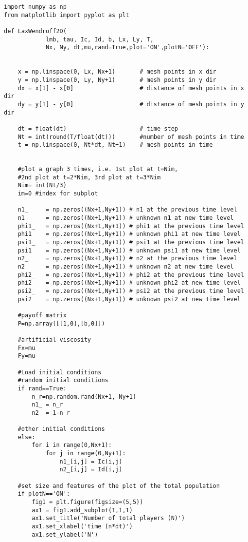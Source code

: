 \begin{lstlisting}
import numpy as np
from matplotlib import pyplot as plt

def LaxWendroff2D(
			lmb, tau, Ic, Id, b, Lx, Ly, T,
			Nx, Ny, dt,mu,rand=True,plot='ON',plotN='OFF'):
   
    
    x = np.linspace(0, Lx, Nx+1)       # mesh points in x dir
    y = np.linspace(0, Ly, Ny+1)       # mesh points in y dir
    dx = x[1] - x[0]                   # distance of mesh points in x dir 
    dy = y[1] - y[0]                   # distance of mesh points in y dir 

    dt = float(dt)                     # time step
    Nt = int(round(T/float(dt)))       #number of mesh points in time
    t = np.linspace(0, Nt*dt, Nt+1)    # mesh points in time

    
    #plot a graph 3 times, i.e. 1st plot at t=Nim, 
    #2nd plot at t=2*Nim, 3rd plot at t=3*Nim
    Nim= int(Nt/3)
    im=0 #index for subplot
       
    n1_     = np.zeros((Nx+1,Ny+1)) # n1 at the previous time level
    n1      = np.zeros((Nx+1,Ny+1)) # unknown n1 at new time level
    phi1_   = np.zeros((Nx+1,Ny+1)) # phi1 at the previous time level
    phi1    = np.zeros((Nx+1,Ny+1)) # unknown phi1 at new time level
    psi1_   = np.zeros((Nx+1,Ny+1)) # psi1 at the previous time level
    psi1    = np.zeros((Nx+1,Ny+1)) # unknown psi1 at new time level
    n2_     = np.zeros((Nx+1,Ny+1)) # n2 at the previous time level
    n2      = np.zeros((Nx+1,Ny+1)) # unknown n2 at new time level
    phi2_   = np.zeros((Nx+1,Ny+1)) # phi2 at the previous time level
    phi2    = np.zeros((Nx+1,Ny+1)) # unknown phi2 at new time level
    psi2_   = np.zeros((Nx+1,Ny+1)) # psi2 at the previous time level
    psi2    = np.zeros((Nx+1,Ny+1)) # unknown psi2 at new time level

    #payoff matrix
    P=np.array([[1,0],[b,0]])
    
    #artificial viscosity
    Fx=mu
    Fy=mu

    #Load initial conditions
    #random initial conditions
    if rand==True:
        n_r=np.random.rand(Nx+1, Ny+1)
        n1_ = n_r
        n2_ = 1-n_r
        
    #other initial conditions    
    else:
        for i in range(0,Nx+1):
            for j in range(0,Ny+1):
                n1_[i,j] = Ic(i,j)
                n2_[i,j] = Id(i,j)

    #set size and features of the plot of the total population
    if plotN=='ON':
        fig1 = plt.figure(figsize=(5,5))           
        ax1 = fig1.add_subplot(1,1,1)
        ax1.set_title('Number of total players (N)')
        ax1.set_xlabel('time (n*dt)')
        ax1.set_ylabel('N')
    

\end{lstlisting}
